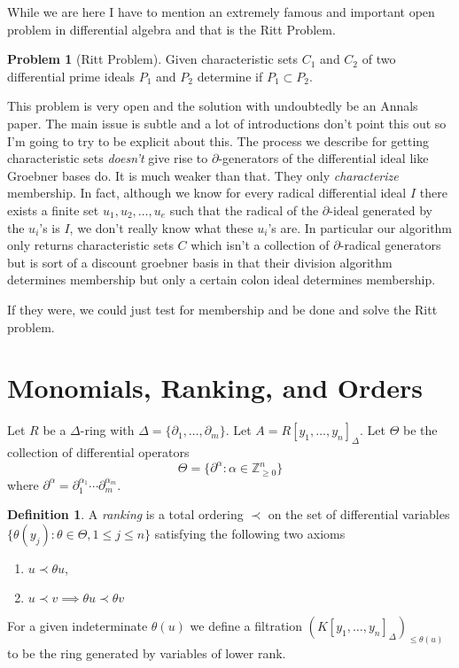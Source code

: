 \documentclass[12pt]{book}
\numberwithin{equation}{section}
\theoremstyle{definition}
\newtheorem{problem}[theorem]{Problem}
\newtheorem{definition}[theorem]{Definition}
\theoremstyle{remark}
\newcommand{\ZZ}{\mathbb{Z}}
\begin{document}
While we are here I have to mention an extremely famous and important open problem in differential algebra and that is the Ritt Problem.
\begin{problem}[Ritt Problem]
	Given characteristic sets $C_1$ and $C_2$ of two differential prime ideals $P_1$ and $P_2$ determine if $P_1 \subset P_2$.
\end{problem}
This problem is very open and the solution with undoubtedly be an Annals paper.  
The main issue is subtle and a lot of introductions don't point this out so I'm going to try to be explicit about this.
The process we describe for getting characteristic sets \emph{doesn't} give rise to $\partial$-generators of the differential ideal like Groebner bases do. 
It is much weaker than that. 
They only \emph{characterize} membership.
In fact, although we know for every radical differential ideal $I$ there exists a finite set $u_1,u_2,\ldots,u_e$ such that the radical of the $\partial$-ideal generated by the $u_i$'s is $I$, we don't really know what these $u_i$'s are. 
In particular our algorithm only returns characteristic sets $C$ which isn't a collection of $\partial$-radical generators but is sort of a discount groebner basis in that their division algorithm determines membership but only a certain colon ideal determines membership.

If they were, we could just test for membership and be done and solve the Ritt problem. 

\section{Monomials, Ranking, and Orders}\label{S:PDE-ranking}
Let $R$ be a $\Delta$-ring with $\Delta = \lbrace \partial_1,\ldots,\partial_m \rbrace$.
Let $A = R[y_1,\ldots,y_n]_{\Delta}$. 
Let $\Theta$ be the collection of differential operators
$$ \Theta = \lbrace \partial^{\alpha} \colon \alpha \in \ZZ_{\geq 0}^n \rbrace$$
where $\partial^{\alpha} = \partial_1^{\alpha_1}\cdots \partial_m^{\alpha_m}$.
\begin{definition}
	A \emph{ranking} is a total ordering $\prec$ on the set of differential variables
	$ \lbrace \theta(y_j) \colon \theta \in \Theta, 1\leq j \leq n \rbrace $
	satisfying the following two axioms
	\begin{enumerate}[topsep=0pt]
		\item $ u \prec \theta u$, 
		\item $u \prec v \implies \theta u \prec \theta v $
	\end{enumerate}
\end{definition}
For a given indeterminate $\theta(u)$ we define a filtration $(K[y_1,\ldots,y_n]_{\Delta})_{\leq \theta(u)}$ to be the ring generated by variables of lower rank.
\end{document}
